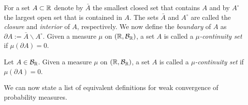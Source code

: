 %


For a set $A \subset \mathbb R$ denote by $\bar{A}$ the smallest closed set that contains $A$ and by $A^\circ$ the largest open set that is contained in $A$. The sets $\bar{A}$ and $A^\circ$ are called the \emph{closure} and \emph{interior} of $A$, respectively. We now define the \emph{boundary} of $A$ as $\partial A := \bar{A} \backslash A^\circ$. Given a measure $\mu$ on $(\mathbb R, \mathcal B_{\mathbb R})$, a set $A$ is called a \emph{$\mu$-continuity set} if $\mu(\partial A) = 0$.

\begin{definition}
	Let $A\in\mathcal B_{\mathbb R}$. Given a measure $\mu$ on $(\mathbb R, \mathcal B_{\mathbb R})$, a set $A$ is called a \emph{$\mu$-continuity set} if $\mu(\partial A) = 0$.
\end{definition}

We can now state a list of equivalent definitions for weak convergence of probability measures.

